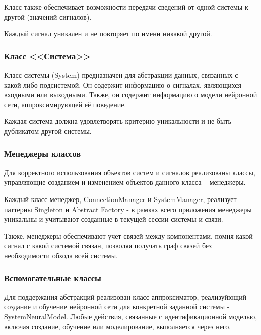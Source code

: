Класс также обеспечивает возможности передачи сведений от одной системы к другой (значений сигналов). 

Каждый сигнал уникален и не повторяет по имени никакой другой.

\subsubsection{Класс <<Система>>}

Класс системы (System) предназначен для абстракции данных, связанных с
какой-либо подсистемой. Он содержит информацию о сигналах, являющихся входными
или выходными. Также, он содержит информацию о модели нейронной сети,
аппроксимирующей её поведение. 

Каждая система должна удовлетворять критерию уникальности и не быть дубликатом
другой системы. 

\subsubsection{Менеджеры классов}

Для корректного использования объектов систем и сигналов
реализованы классы, управляющие созданием и изменением объектов данного
класса – менеджеры. 

Каждый класс-менеджер, ConnectionManager и SystemManager, реализует паттерны
Singleton и Abstract Factory - в рамках всего приложения менеджеры уникальны и
учитывают созданные в текущей сессии системы и связи. 

Также, менеджеры обеспечивают учет связей между компонентами, помня какой
сигнал с какой системой связан, позволяя получать граф связей без необходимости
обхода всей системы.

\subsubsection{Вспомогательные классы}

Для поддержания абстракций реализован класс аппроксиматор, реализуйющий
создание и обучение нейронной сети для конкретной заданной системы -
SystemNeuralModel. Любые действия, связанные с идентификационной моделью,
включая создание, обучение или моделирование, выполняется через него. 

